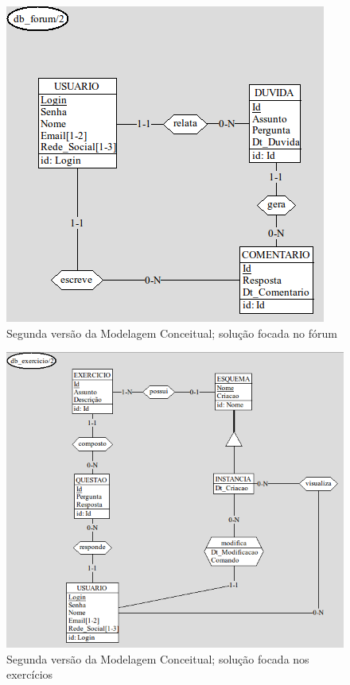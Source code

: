 \documentclass[graduacao,brazil]{ThesisPUC}
\begin{document}
\begin{figure}[H]
    \centering
    \includegraphics[width=\linewidth]{Imagens/ModelagemConceitual_forum_v1_1.png}
    \caption{Segunda vers\~{a}o da Modelagem Conceitual; solu\c{c}\~{a}o focada no f\'{o}rum}
\end{figure}

\begin{figure}[H]
    \centering
    \includegraphics[width=\linewidth]{Imagens/ModelagemConceitual_exercicio_v1_1.png}
    \caption{Segunda vers\~{a}o da Modelagem Conceitual; solu\c{c}\~{a}o focada nos exerc\'{i}cios}
\end{figure}
\end{document}
